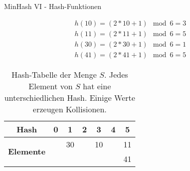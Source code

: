 \begin{frame}{MinHash VI - Hash-Funktionen}
    \begin{example}
        \begin{equation*}
            \begin{split}
                h(10) = (2 * 10 + 1) \mod 6 = 3 \\
                h(11) = (2 * 11 + 1) \mod 6 = 5 \\
                h(30) = (2 * 30 + 1) \mod 6 = 1 \\
                h(41) = (2 * 41 + 1) \mod 6 = 5
            \end{split}
        \end{equation*}
    \end{example}

    \pause
    
    \begin{table}[H]
        \centering
        \begin{tabular}{| c | c | c | c | c | c | c |}
            \hline
            \textbf{Hash} & \textbf{0} & \textbf{1} & \textbf{2} & \textbf{3} & \textbf{4} & \textbf{5}  \\
            \hline
            \multirow{2}{*}{\textbf{Elemente}} &  & 30 &    & 10 &    & 11 \\
            & &    &    &    &    & 41 \\
            \hline
        \end{tabular}    
        \caption{Hash-Tabelle der Menge $ S $. Jedes Element von $ S $ hat eine unterschiedlichen Hash. Einige Werte erzeugen Kollisionen.}
    \end{table} 
\end{frame}